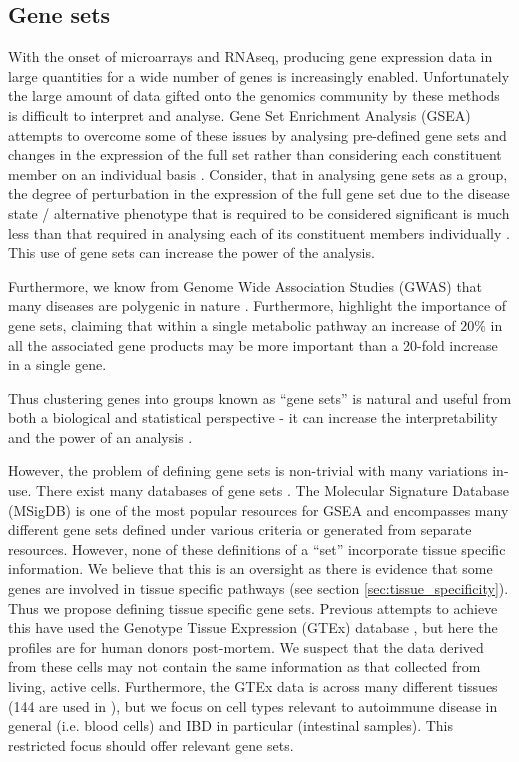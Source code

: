 \documentclass[12pt]{article} %
\begin{document}
	\subsection{Gene sets}
	With the onset of microarrays and RNAseq, producing gene expression data in large quantities for a wide number of genes is increasingly enabled. Unfortunately the large amount of data gifted onto the genomics community by these methods is difficult to interpret and analyse. Gene Set Enrichment Analysis (GSEA) attempts to overcome some of these issues by analysing pre-defined gene sets and changes in the expression of the full set rather than considering each constituent member on an individual basis \cite{mooney_gene_2015}. Consider, that in analysing gene sets as a group, the degree of perturbation in the expression of the full gene set due to the disease state / alternative phenotype that is required to be considered significant is much less than that required in analysing each of its constituent members individually \cite{dudbridge_power_2013}\cite{wray_research_2014}. This use of gene sets can increase the power of the analysis.
	
	Furthermore, we know from Genome Wide Association Studies (GWAS) that many diseases are polygenic in nature \cite{mooney_gene_2015}. Furthermore, \citet{subramanian_gene_2005} highlight the importance of gene sets, claiming that within a single metabolic pathway an increase of $20\%$ in all the associated gene products may be more important than a 20-fold increase in a single gene.
	
	Thus clustering genes into groups known as ``gene sets'' is natural and useful from both a biological and statistical perspective - it can increase the interpretability and the power of an analysis \cite{nica_expression_2013}\cite{vosa_unraveling_2018}.
	
	However, the problem of defining gene sets is non-trivial with many variations in-use. There exist many databases of gene sets \cite{ashburner_gene_2000}\cite{kanehisa_new_2019}\cite{szklarczyk_string_2019}. The Molecular Signature Database \cite{subramanian_gene_2005} (MSigDB) is one of the most popular resources for GSEA and encompasses many different gene sets defined under various criteria or generated from separate resources. However, none of these definitions of a ``set'' incorporate tissue specific information. We believe that this is an oversight as there is evidence that some genes are involved in tissue specific pathways (see section \ref{sec:tissue_specificity}). Thus we propose defining tissue specific gene sets. Previous attempts to achieve this have used the Genotype Tissue Expression (GTEx) \cite{gtex_consortium_genetic_2017} database \cite{lonsdale_genotype-tissue_2013}, but here the profiles are for human donors
	post-mortem. We suspect that the data derived from these cells may not contain the same information as that collected from living, active cells. Furthermore, the GTEx data is across many different tissues (144 are used in \cite{lonsdale_genotype-tissue_2013}), but we focus on cell types relevant to autoimmune disease in general (i.e. blood cells) and IBD in particular (intestinal samples). This restricted focus should offer relevant gene sets.
		
\end{document}
